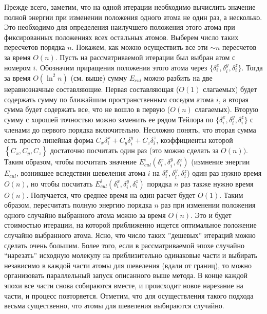   Прежде всего, заметим, что на одной итерации необходимо вычислить значение полной энергии при изменении положения одного атома не один раз, а несколько. Это необходимо для определения наилучшего положения этого атома при фиксированных положениях всех остальных атомов. Выберем число таких пересчетов порядка $n$. Покажем, как можно осуществить все эти $\sim n$ пересчетов за время ${O}\left( n \right)$. Пусть на рассматриваемой итерации был выбран атом с номером $i$. Обозначим приращения положения этого   атома через $\{\delta _i^x ,\delta _i^y ,\delta _i^z \}$. Тогда за время 
  ${O}\left( {\ln ^2n} \right)$ (см. выше) сумму $E_{cul}$ можно разбить на две 
  неравнозначные составляющие. Первая составляющая (${O}\left( 1 \right)$ 
  слагаемых) будет содержать сумму по ближайшим пространственным соседям атома 
  $i$, а вторая сумма будет содержать все, что не вошло в первую (${
  O}\left( n \right)$ слагаемых). Вторую сумму с хорошей точностью можно 
  заменить ее рядом Тейлора по $\{\delta _i^x ,\delta _i^y ,\delta _i^z \}$ с 
  членами до первого порядка включительно. 
  Несложно понять, что вторая сумма есть просто линейная форма 
  $C_x \delta _i^x + C_y \delta _i^y +C_z \delta _i^z $, коэффициенты которой 
  $\left\{ {C_x ,C_y ,C_z } \right\}$ достаточно посчитать один раз (это можно 
  сделать за ${O}\left( n \right))$. Таким образом, чтобы посчитать 
  значение $E_{cul}^i \left( {\delta _i^x ,\delta _i^y ,\delta _i^z } 
  \right)$ (измнение энергии $E_{cul}$, возникшее вследствии шевеления атома $i$ на ${\delta _i^x ,\delta _i^y ,\delta _i^z }$) один раз нужно время ${O}\left( n \right)$, но чтобы посчитать 
  $E_{cul}^i \left( {\delta _i^x ,\delta _i^y ,\delta _i^z } \right)$ порядка 
  $n$ раз также нужно время ${O}\left( n \right)$. Получается, что среднее 
  время на один расчет будет ${O}\left( 1 \right)$. Таким образом, 
  пересчитать полную энергию порядка $n$ раз при изменении положения одного 
  случайно выбранного атома можно за время ${O}\left( 
  n \right)$. Это и будет стоимостью итерации, на которой приближенно ищется 
  оптимальное положение случайно выбранного атома. Ясно, что число таких 
  ''дешевых'' итераций можно сделать очень большим. Более того, если 
  в рассматриваемой эпохе случайно ``нарезать'' исходную молекулу на 
  приблизительно одинаковые части и выбирать независимо в каждой части атомы 
  для шевеления (вдали от границ), то можно организовать параллельный запуск 
  описанного выше метода. В конце каждой эпохи все части снова собираются 
  вместе, и происходит новое нарезание на части, и процесс повторяется. Отметим, что для осуществления такого подхода весьма существенно, что атомы для шевеления выбираются случайно. 


